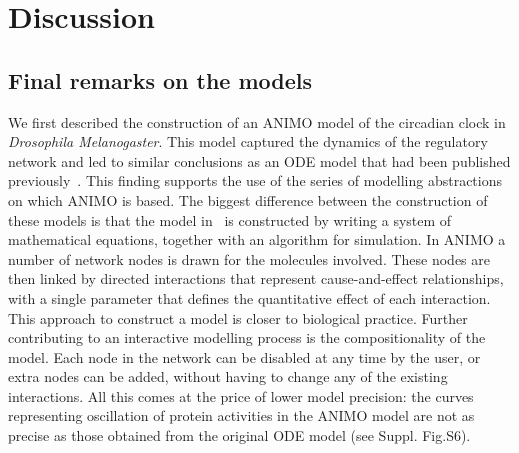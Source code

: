 \documentclass{bmcart}
\begin{document}
\section*{Discussion}
\subsection*{Final remarks on the models}
We first described the construction of an ANIMO
model of the circadian clock in \emph{Drosophila Melanogaster}. This model
captured the dynamics of the regulatory network and led to similar
conclusions as an ODE model that had been
published previously~\cite{drosophila-ode-model}. This finding supports the use of
the series of modelling abstractions on which ANIMO is based. The biggest
difference between the construction of these models is that the model in~\cite{drosophila-ode-model}
is constructed by writing a system of mathematical equations, together
with an algorithm for simulation. In ANIMO a number of network
nodes is drawn for the molecules involved.
These nodes are then linked by directed
interactions that represent cause-and-effect relationships, with a single parameter
that defines the quantitative effect of each
interaction. This approach to construct a model is closer to biological practice.
Further contributing to an interactive modelling process
is the compositionality of the model. Each node in the network
can be disabled at any time by the user, or extra nodes can be added,
without having to change any of the existing interactions.
All this comes at the price of lower model precision: the curves representing
oscillation of protein activities in the ANIMO model are not
as precise as those obtained from the original ODE model (see Suppl. Fig.S6). %
\end{document}
